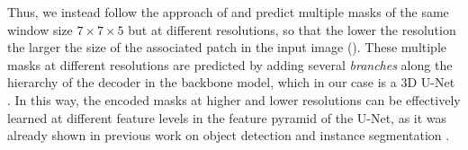Thus, we instead follow the approach of \cite{Gao_2019_ICCV} and predict multiple \maskname masks of the same window size $7 \times 7 \times 5$ but at different resolutions, so that the lower the resolution the larger the size of the associated patch in the input image  (). 
These multiple masks at different resolutions are predicted by adding several \emph{\encBr branches} along the hierarchy of the decoder in the backbone model, which in our case is a 3D U-Net \cite{ronneberger2015u,cciccek20163d}. 
In this way, the encoded \maskname masks at higher and lower resolutions can be effectively learned at different feature levels in the feature pyramid of the U-Net, as it was already shown in previous work on object detection and instance segmentation \cite{Gao_2019_ICCV,lin2017feature}.



